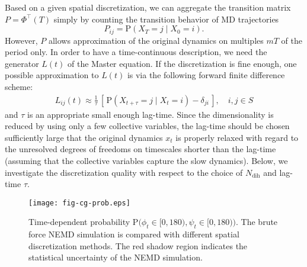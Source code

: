 \documentclass[journal=jctcce,manuscript=article]{achemso}
\newcommand{\recheck}[1]{{\color{red} #1}}
\newcommand{\vect}[1]{#1}
\newcommand{\myphi}{\Phi}
\newcommand{\prob}{\textrm{P}}
\newcommand{\dih}{\textrm{dih}}
\begin{document}
Based on a given spatial discretization, we can aggregate the transition matrix $\vect P=\myphi^{\top}(T)$ simply by counting the transition behavior of MD trajectories 
\begin{equation}\label{Pdirect}
\vect P_{ij}=\prob\left(\vect X_T=j\mid \vect X_0=i \right).
\end{equation}
However, $\vect P$ allows approximation of the original dynamics on multiples $mT$ of the period only. In order to have a time-continuous description, we need the generator $L(t)$ of the Master equation. 
If the discretization is fine enough, one possible approximation to $L(t)$ is via
the following forward finite difference scheme:
\begin{align}
  \label{eqn:tmp4}
  L_{ij}(t) \approx \frac{1}{\tau}
  \,[\, \prob (\vect X_{t+\tau} = j \mid \vect X_{t} = i) - \delta_{ji} \,],
  \quad i,j\in S
\end{align}
and $\tau$ is an appropriate small enough lag-time.
  Since the dimensionality is reduced by using only a few collective
  variables, the lag-time should be chosen sufficiently large that
  the original dynamics $x_t$ is properly relaxed with regard to
  the unresolved degrees of freedoms on timescales shorter than the lag-time
  (assuming  that the collective variables capture the slow dynamics).
  Below, 
we investigate the discretization
quality with respect to  the choice of $N_\dih$ and  lag-time $\tau$.

%



\begin{figure}
  \centering
  \texttt{[image: fig-cg-prob.eps]}  
  \caption{Time-dependent probability $\prob\big(\phi_t\in[0,180), \psi_t\in [0,180)\big)$.  The brute force NEMD simulation is compared with different
    spatial discretization methods. The red shadow region indicates the
    statistical uncertainty of the NEMD simulation.}
  \label{fig:tmp2}
\end{figure}
\end{document}
